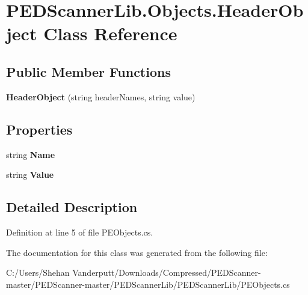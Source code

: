 \hypertarget{class_p_e_d_scanner_lib_1_1_objects_1_1_header_object}{}\section{P\+E\+D\+Scanner\+Lib.\+Objects.\+Header\+Object Class Reference}
\label{class_p_e_d_scanner_lib_1_1_objects_1_1_header_object}
\subsection*{Public Member Functions}
\begin{DoxyCompactItemize}
\item 
\mbox{\label{class_p_e_d_scanner_lib_1_1_objects_1_1_header_object_ac42bc18545d3b2abbffa699480b0d015}} 
{\bfseries Header\+Object} (string header\+Names, string value)
\end{DoxyCompactItemize}
\subsection*{Properties}
\begin{DoxyCompactItemize}
\item 
\mbox{\label{class_p_e_d_scanner_lib_1_1_objects_1_1_header_object_aec97bbceceb864bdab14b4207146b82b}} 
string {\bfseries Name}
\item 
\mbox{\label{class_p_e_d_scanner_lib_1_1_objects_1_1_header_object_a729d5357389ac6defcc1f9add4aba35e}} 
string {\bfseries Value}
\end{DoxyCompactItemize}


\subsection{Detailed Description}


Definition at line 5 of file P\+E\+Objects.\+cs.



The documentation for this class was generated from the following file\+:\begin{DoxyCompactItemize}
\item 
C\+:/\+Users/\+Shehan Vanderputt/\+Downloads/\+Compressed/\+P\+E\+D\+Scanner-\/master/\+P\+E\+D\+Scanner-\/master/\+P\+E\+D\+Scanner\+Lib/\+P\+E\+D\+Scanner\+Lib/P\+E\+Objects.\+cs\end{DoxyCompactItemize}
